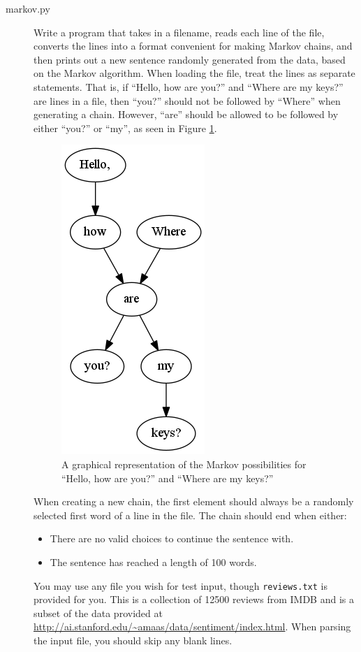\documentclass[11pt]{cselabheader}
\begin{document}
\begin{description}
\item[markov.py] Write a program that takes in a filename, reads each line of the file, converts the lines into a format convenient for making Markov chains, and then prints out a new sentence randomly generated from the data, based on the Markov algorithm. When loading the file, treat the lines as separate statements. That is, if ``Hello, how are you?'' and ``Where are my keys?'' are lines in a file, then ``you?'' should not be followed by ``Where'' when generating a chain. However, ``are'' should be allowed to be followed by either ``you?'' or ``my'', as seen in Figure \ref{mark_ex}.

  \begin{figure}[h]
    \centering
    \includegraphics[width=0.2\linewidth]{lab10/example}
    \caption{A graphical representation of the Markov possibilities for ``Hello, how are you?'' and ``Where are my keys?''}
    \label{mark_ex}
  \end{figure}

  When creating a new chain, the first element should always be a randomly selected first word of a line in the file. The chain should end when either:
  \begin{itemize}
  \item There are no valid choices to continue the sentence with.
  \item The sentence has reached a length of 100 words.
  \end{itemize}

  You may use any file you wish for test input, though \lstinline{reviews.txt} is provided for you. This is a collection of 12500 reviews from IMDB and is a subset of the data provided at \url{http://ai.stanford.edu/~amaas/data/sentiment/index.html}. When parsing the input file, you should skip any blank lines.
  
\end{description}
\end{document}
